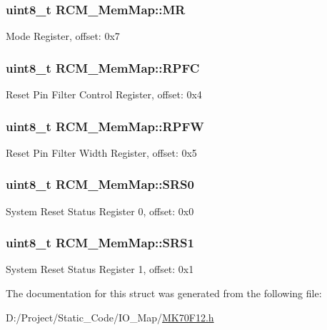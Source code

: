 \subsubsection[{M\+R}]{\setlength{\rightskip}{0pt plus 5cm}uint8\+\_\+t R\+C\+M\+\_\+\+Mem\+Map\+::\+M\+R}\label{struct_r_c_m___mem_map_a0e7b707ffc94ef2a3c49a5ca51acc6c9}
Mode Register, offset\+: 0x7 \hypertarget{struct_r_c_m___mem_map_ace89c039f8342f8b5dd26c3c7b8309a2}{}
\subsubsection[{R\+P\+F\+C}]{\setlength{\rightskip}{0pt plus 5cm}uint8\+\_\+t R\+C\+M\+\_\+\+Mem\+Map\+::\+R\+P\+F\+C}\label{struct_r_c_m___mem_map_ace89c039f8342f8b5dd26c3c7b8309a2}
Reset Pin Filter Control Register, offset\+: 0x4 \hypertarget{struct_r_c_m___mem_map_ac458f95f6aa234285f568694a5b8240d}{}
\subsubsection[{R\+P\+F\+W}]{\setlength{\rightskip}{0pt plus 5cm}uint8\+\_\+t R\+C\+M\+\_\+\+Mem\+Map\+::\+R\+P\+F\+W}\label{struct_r_c_m___mem_map_ac458f95f6aa234285f568694a5b8240d}
Reset Pin Filter Width Register, offset\+: 0x5 \hypertarget{struct_r_c_m___mem_map_aa28b91bdb2e1acc454f7bcb9ad26efb7}{}
\subsubsection[{S\+R\+S0}]{\setlength{\rightskip}{0pt plus 5cm}uint8\+\_\+t R\+C\+M\+\_\+\+Mem\+Map\+::\+S\+R\+S0}\label{struct_r_c_m___mem_map_aa28b91bdb2e1acc454f7bcb9ad26efb7}
System Reset Status Register 0, offset\+: 0x0 \hypertarget{struct_r_c_m___mem_map_a8e7926e6f51e64e63e5ed3adb7aee612}{}
\subsubsection[{S\+R\+S1}]{\setlength{\rightskip}{0pt plus 5cm}uint8\+\_\+t R\+C\+M\+\_\+\+Mem\+Map\+::\+S\+R\+S1}\label{struct_r_c_m___mem_map_a8e7926e6f51e64e63e5ed3adb7aee612}
System Reset Status Register 1, offset\+: 0x1 

The documentation for this struct was generated from the following file\+:\begin{DoxyCompactItemize}
\item 
D\+:/\+Project/\+Static\+\_\+\+Code/\+I\+O\+\_\+\+Map/\hyperlink{_m_k70_f12_8h}{M\+K70\+F12.\+h}\end{DoxyCompactItemize}
